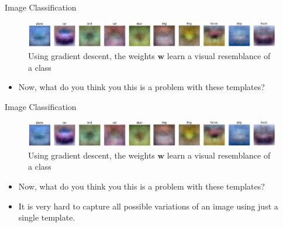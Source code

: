 \begin{frame}{Image Classification}
    \begin{figure}
    \centering
    \includegraphics[width=\textwidth]{img/templates.jpg}
    \caption{Using gradient descent, the weights $\textbf{w}$ learn a visual resemblance of a class}
    \end{figure}
    \begin{itemize}
        \item Now, what do you think you this is a problem with these templates?
    \end{itemize}
\end{frame}

\begin{frame}{Image Classification}
    \begin{figure}
    \centering
    \includegraphics[width=\textwidth]{img/templates.jpg}
    \caption{Using gradient descent, the weights $\textbf{w}$ learn a visual resemblance of a class}
    \end{figure}
    \begin{itemize}
        \item Now, what do you think you this is a problem with these templates?
        \item It is very hard to capture all possible variations of an image using just a single template.
    \end{itemize}
\end{frame}